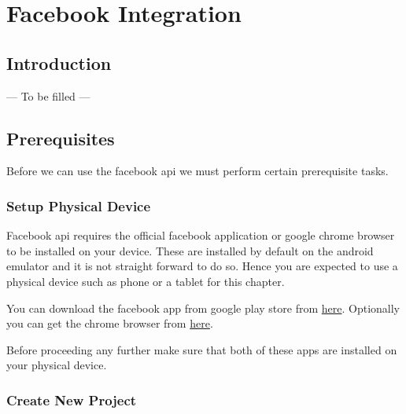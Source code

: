 


\chapter{Facebook Integration}
\label{FBI}

\section{Introduction}
\label{FBI:introduction}
--- To be filled ---

\section{Prerequisites}
\label{FBI:settingUpProject}

Before we can use the facebook api we must perform certain prerequisite tasks.

\subsection{Setup Physical Device}
\label{FBI:usePhysicalDevice}
Facebook api requires the official facebook application or google chrome browser to be installed on your device. These are installed by default on the android emulator and it is not straight forward to do so. Hence you are expected to use a physical device such as phone or a tablet for this chapter. 

You can download the facebook app from google play store from \href{https://play.google.com/store/apps/details?id=com.facebook.katana&hl=en}{here}. Optionally you can get the chrome browser from \href{https://play.google.com/store/apps/details?id=com.android.chrome&hl=en}{here}.

Before proceeding any further make sure that both of these apps are installed on your physical device.

\subsection{Create New Project}
\label{FBI:createProj}

